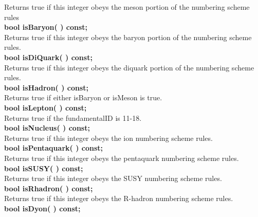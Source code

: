 \begin{tabbing}
\hspace{1.0in}  Returns true if this integer obeys the meson  portion of the numbering scheme rules\\
\hspace{0.5in}  {\bf bool isBaryon( )  const; }\\
\hspace{1.0in}  Returns true if this integer obeys the baryon portion of the numbering scheme rules.\\
\hspace{0.5in}  {\bf bool isDiQuark( ) const; }\\
\hspace{1.0in}  Returns true if this integer obeys the diquark portion of the numbering scheme rules.\\
\hspace{0.5in}  {\bf bool isHadron( )  const; }\\
\hspace{1.0in}  Returns true if either isBaryon or isMeson is true. \\
\hspace{0.5in}  {\bf bool isLepton( )  const; }\\
\hspace{1.0in}  Returns true if the fundamentalID is 11-18. \\
\hspace{0.5in}  {\bf bool isNucleus( )  const; }\\
\hspace{1.0in}  Returns true if this integer obeys the ion numbering scheme rules. \\
\hspace{0.5in}  {\bf bool isPentaquark( )  const; }\\
\hspace{1.0in}  Returns true if this integer obeys the pentaquark numbering scheme rules. \\
\hspace{0.5in}  {\bf bool isSUSY( )  const; }\\
\hspace{1.0in}  Returns true if this integer obeys the SUSY numbering scheme rules. \\
\hspace{0.5in}  {\bf bool isRhadron( )  const; }\\
\hspace{1.0in}  Returns true if this integer obeys the R-hadron numbering scheme rules. \\
\hspace{0.5in}  {\bf bool isDyon( )  const; }\\

\end{tabbing}
